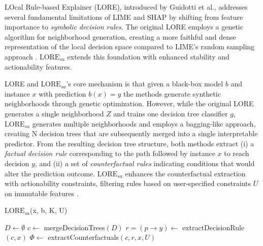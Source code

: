 LOcal Rule-based Explainer (LORE), introduced by Guidotti et al.\cite{guidotti2019lore}, addresses several fundamental limitations of LIME and SHAP by shifting from feature importance to \textit{symbolic decision rules}. The original LORE employs a genetic algorithm for neighborhood generation, creating a more faithful and dense representation of the local decision space compared to LIME's random sampling approach \cite{bodria2023benchmarking}. $\text{LORE}_{sa}$ extends this foundation with enhanced stability and actionability features.

LORE and $\text{LORE}_{sa}$'s core mechanism is that given a black-box model $b$ and instance $x$ with prediction $b(x) = y$ the methods generate synthetic neighborhoods through genetic optimization. However, while the original LORE generates a single neighborhood $Z$ and trains one decision tree classifier $g$, $\text{LORE}_{sa}$ generates multiple neighborhoods and employs a bagging-like approach, creating N decision trees that are subsequently merged into a single interpretable predictor. From the resulting decision tree structure, both methods extract (i) a \textit{factual decision rule} corresponding to the path followed by instance $x$ to reach decision $y$, and (ii) a set of \textit{counterfactual rules} indicating conditions that would alter the prediction outcome. $\text{LORE}_{sa}$ enhances the counterfactual extraction with actionability constraints, filtering rules based on user-specified constraints $U$ on immutable features \cite{guidotti2022stable, bodria2023benchmarking}.

\begin{algorithm}[H]
\label{alg:LORE_sa}
\caption{$\text{LORE}_{sa}$(x, b, K, U)}
$D \leftarrow \emptyset$ 
$c \leftarrow$ mergeDecisionTrees$(D)$ 
$r = (p \rightarrow y) \leftarrow$ extractDecisionRule$(c, x)$ 
$\Phi \leftarrow$ extractCounterfactuals$(c, r, x, U)$ 
\;
\end{algorithm}

